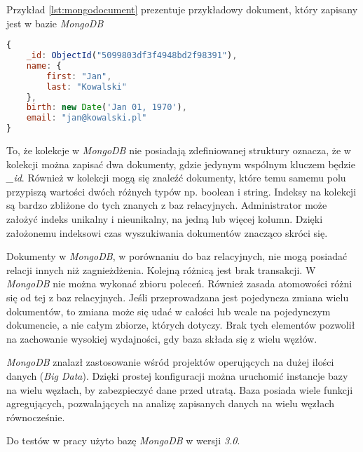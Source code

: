 Przykład \ref{lst:mongodocument} prezentuje przykładowy dokument, który zapisany jest w bazie \textsl{MongoDB}

\begin{lstlisting}[language=JavaScript,caption=Przykład dokumentu zapisanego w bazie MongoDB,label={lst:mongodocument}]
{
    _id: ObjectId("5099803df3f4948bd2f98391"),
    name: { 
        first: "Jan", 
        last: "Kowalski" 
    },
    birth: new Date('Jan 01, 1970'),
    email: "jan@kowalski.pl"
}
\end{lstlisting}

To, że kolekcje w \textsl{MongoDB} nie posiadają zdefiniowanej struktury oznacza, że w kolekcji można zapisać dwa dokumenty, gdzie jedynym wspólnym kluczem będzie \textsl{\_id}. Również w kolekcji mogą się znaleźć dokumenty, które temu samemu polu przypiszą wartości dwóch różnych typów np. boolean i string. Indeksy na kolekcji są bardzo zbliżone do tych znanych z baz relacyjnych. Administrator może założyć indeks unikalny i nieunikalny, na jedną lub więcej kolumn. Dzięki założonemu indeksowi czas wyszukiwania dokumentów znacząco skróci się.

Dokumenty w \textsl{MongoDB}, w porównaniu do baz relacyjnych, nie mogą posiadać relacji innych niż zagnieżdżenia. Kolejną różnicą jest brak transakcji. W \textsl{MongoDB} nie można wykonać zbioru poleceń. Również zasada atomowości różni się od tej z baz relacyjnych. Jeśli przeprowadzana jest pojedyncza zmiana wielu dokumentów, to zmiana może się udać w całości lub wcale na pojedynczym dokumencie, a nie całym zbiorze, których dotyczy. Brak tych elementów pozwolił na zachowanie wysokiej wydajności, gdy baza składa się z wielu węzłów.

\textsl{MongoDB} znalazł zastosowanie wśród projektów operujących na dużej ilości danych (\textsl{Big Data}). Dzięki prostej konfiguracji można uruchomić instancje bazy na wielu węzłach, by zabezpieczyć dane przed utratą. Baza posiada wiele funkcji agregujących, pozwalających na analizę zapisanych danych na wielu węzłach równocześnie.

Do testów w pracy użyto bazę \textsl{MongoDB} w wersji \textsl{3.0}.


